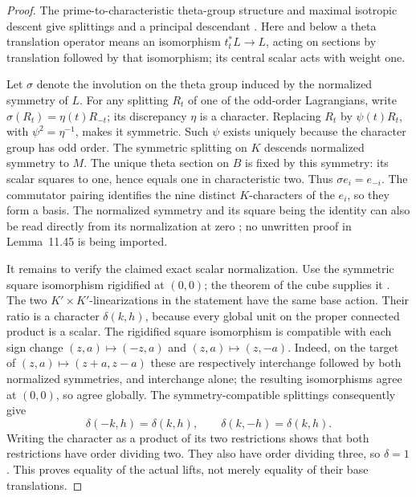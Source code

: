 \begin{proof}
The prime-to-characteristic theta-group structure and maximal
isotropic descent give splittings and a principal descendant
\citep[Corollary~8.20, Lemma~8.24, Theorem~8.28;
Theorem~8.10 and Corollary~8.14]{EdixhovenVanDerGeerMoonenAV}.
Here and below a theta translation operator means an isomorphism
\(t_t^*L\to L\), acting on sections by translation followed by that
isomorphism; its central scalar acts with weight one.

Let \(\sigma\) denote the involution on the theta group induced by
the normalized symmetry of \(L\).  For any splitting \(R_t\) of
one of the odd-order Lagrangians, write
\(\sigma(R_t)=\eta(t)R_{-t}\); its discrepancy \(\eta\) is a
character.  Replacing \(R_t\) by \(\psi(t)R_t\), with
\(\psi^2=\eta^{-1}\), makes it symmetric.  Such \(\psi\) exists
uniquely because the character group has odd order.  The symmetric
splitting on \(K\) descends normalized symmetry to \(M\).
The unique theta section on \(B\) is fixed by this symmetry: its
scalar squares to one, hence equals one in characteristic two.
Thus \(\sigma e_i=e_{-i}\).  The commutator pairing identifies the
nine distinct \(K\)-characters of the \(e_i\), so they form a basis.
The normalized symmetry and its square being the identity can also
be read directly from its normalization at zero
\citep[Definition~11.44, p.~178]{EdixhovenVanDerGeerMoonenAV}; no
unwritten proof in Lemma~11.45 is being imported.

It remains to verify the claimed exact scalar normalization.
Use the symmetric square isomorphism rigidified at \((0,0)\);
the theorem of the cube supplies it
\citep[Theorem~2.7 and Corollary~2.8, pp.~19--20]
{EdixhovenVanDerGeerMoonenAV}.
The two \(K'\times K'\)-linearizations in the statement have the
same base action.  Their ratio is a character \(\delta(k,h)\),
because every global unit on the proper connected product is a
scalar.  The rigidified square isomorphism is compatible with
each sign change \((z,a)\mapsto(-z,a)\) and
\((z,a)\mapsto(z,-a)\).  Indeed, on the target of
\((z,a)\mapsto(z+a,z-a)\) these are respectively interchange
followed by both normalized symmetries, and interchange alone;
the resulting isomorphisms agree at \((0,0)\), so agree globally.
The symmetry-compatible splittings consequently give
\[
 \delta(-k,h)=\delta(k,h),\qquad
 \delta(k,-h)=\delta(k,h).
\]
Writing the character as a product of its two restrictions shows
that both restrictions have order dividing two.  They also have
order dividing three, so \(\delta=1\).  This proves equality of
the actual lifts, not merely equality of their base translations.
\end{proof}

